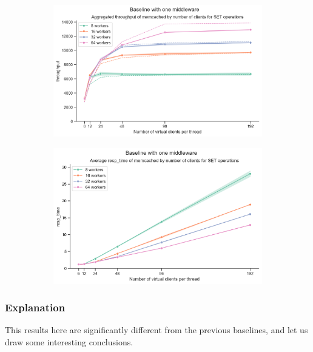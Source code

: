\documentclass[11pt,a4paper]{article}
\begin{document}
\begin{figure}[H]
	\begin{subfigure}[b]{0.5\linewidth}
		\includegraphics[width=\linewidth]{images/middleware_1/last_graph_set_throughput.pdf}
	\end{subfigure}
	\begin{subfigure}[b]{0.5\linewidth}
		\includegraphics[width=\linewidth]{images/middleware_1/last_graph_set_resp_time.pdf}
	\end{subfigure}
	\caption{}
	\label{fig:boat1}
\end{figure}

\subsubsection{Explanation}

This results here are significantly different from the previous baselines, and let us draw some interesting conclusions.
\end{document}
